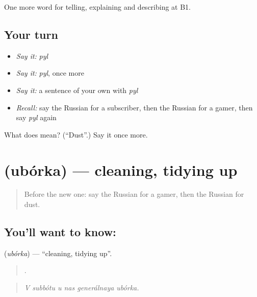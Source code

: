 \begin{grammarlens}[title={What you've built}]
One more word for telling, explaining and describing at B1.
\end{grammarlens}

\subsection*{Your turn}
\begin{itemize}
\raggedright
  \item \emph{Say it:} \emph{pyl}
  \item \emph{Say it:} \emph{pyl}, once more
  \item \emph{Say it:} a sentence of your own with \emph{pyl}
  \item \emph{Recall:} say the Russian for a subscriber, then the Russian for a gamer, then say \emph{pyl} again
\end{itemize}

\begin{tcolorbox}[breakable,colback=teal!4,colframe=teal!35!black,title={Before you move on}]
What does  mean? (\textquotedblleft{}Dust\textquotedblright{}.) Say it once more.
\end{tcolorbox}
\section[\texorpdfstring{\ru{уборка} (ubórka)}{уборка (ubórka)}]{ (ubórka) — cleaning, tidying up}

\label{lesson:RU-C529-uborka}



\begin{quote}
Before the new one: say the Russian for a gamer, then the Russian for dust.
\end{quote}

\subsection*{You'll want to know: }
\textbf{} (\emph{ubórka}) — \textquotedblleft{}cleaning, tidying up\textquotedblright{}.

\begin{quote}
     .
\end{quote}

\begin{quote}
\emph{V subbótu u nas generálnaya ubórka.}
\end{quote}

